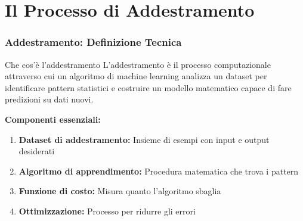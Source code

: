 \documentclass[aspectratio=169]{beamer}
\begin{document}
\section{Il Processo di Addestramento}
%
%
\begin{frame}
\frametitle{Addestramento: Definizione Tecnica}
\begin{block}{Che cos'è l'addestramento}
L'addestramento è il processo computazionale attraverso cui un algoritmo di machine learning analizza un dataset per identificare pattern statistici e costruire un modello matematico capace di fare predizioni su dati nuovi.
\end{block}

\textbf{Componenti essenziali:}
\begin{enumerate}
\item \textbf{Dataset di addestramento:} Insieme di esempi con input e output desiderati
\item \textbf{Algoritmo di apprendimento:} Procedura matematica che trova i pattern
\item \textbf{Funzione di costo:} Misura quanto l'algoritmo sbaglia
\item \textbf{Ottimizzazione:} Processo per ridurre gli errori
\end{enumerate}
\end{frame}
%
%
\end{document}

